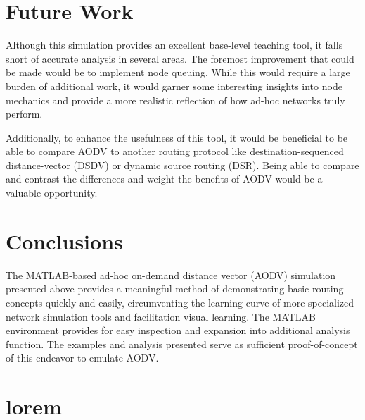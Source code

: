 \documentclass[conference]{IEEEtran}
\begin{document}
\section{Future Work}

Although this simulation provides an excellent base-level teaching tool, it falls short of accurate analysis in several areas. The foremost improvement that could be made would be to implement node queuing. While this would require a large burden of additional work, it would garner some interesting insights into node mechanics and provide a more realistic reflection of how ad-hoc networks truly perform. 

Additionally, to enhance the usefulness of this tool, it would be beneficial to be able to compare AODV to another routing protocol like destination-sequenced distance-vector (DSDV)  or dynamic source routing (DSR). Being able to compare and contrast the differences and weight the benefits of AODV would be a valuable opportunity.

\section{Conclusions}

The MATLAB-based ad-hoc on-demand distance vector (AODV) simulation presented above provides a meaningful method of demonstrating basic routing concepts quickly and easily, circumventing the learning curve of more specialized network simulation tools and facilitation visual learning. The MATLAB environment provides for easy inspection and expansion into additional analysis function. The examples and analysis presented serve as sufficient proof-of-concept of this endeavor to emulate AODV.

\section{lorem}
\lipsum



\end{document}
